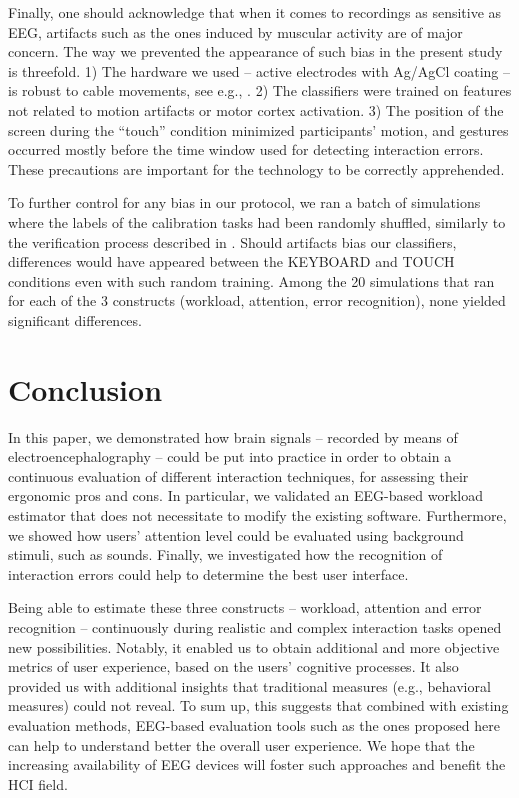 \documentclass[]{sigchi}
\begin{document}
Finally, one should acknowledge that when it comes to recordings as
sensitive as EEG, artifacts such as the ones induced by muscular
activity are of major concern. The way we prevented the appearance of
such bias in the present study is threefold. 1) The hardware we used --
active electrodes with Ag/AgCl coating -- is robust to cable movements,
see e.g., \citep{Wilson2012a}. 2) The classifiers were trained on
features not related to motion artifacts or motor cortex activation. 3)
The position of the screen during the ``touch'' condition minimized
participants' motion, and gestures occurred mostly before the time
window used for detecting interaction errors. These precautions are
important for the technology to be correctly apprehended.

To further control for any bias in our protocol, we ran a batch of
simulations where the labels of the calibration tasks had been randomly
shuffled, similarly to the verification process described in
\citep{Wobrock2015}. Should artifacts bias our classifiers, differences
would have appeared between the KEYBOARD and TOUCH conditions even with
such random training. Among the 20 simulations that ran for each of the
3 constructs (workload, attention, error recognition), none yielded
significant differences.

\section{Conclusion}\label{conclusion}

In this paper, we demonstrated how brain signals -- recorded by means of
electroencephalography -- could be put into practice in order to obtain
a continuous evaluation of different interaction techniques, for
assessing their ergonomic pros and cons. In particular, we validated an
EEG-based workload estimator that does not necessitate to modify the
existing software. Furthermore, we showed how users' attention level
could be evaluated using background stimuli, such as sounds. Finally, we
investigated how the recognition of interaction errors could help to
determine the best user interface.

Being able to estimate these three constructs -- workload, attention and
error recognition -- continuously during realistic and complex
interaction tasks opened new possibilities. Notably, it enabled us to
obtain additional and more objective metrics of user experience, based
on the users' cognitive processes. It also provided us with additional
insights that traditional measures (e.g., behavioral measures) could not
reveal. To sum up, this suggests that combined with existing evaluation
methods, EEG-based evaluation tools such as the ones proposed here can
help to understand better the overall user experience. We hope that the
increasing availability of EEG devices will foster such approaches and
benefit the HCI field.

\balance{}


\end{document}
